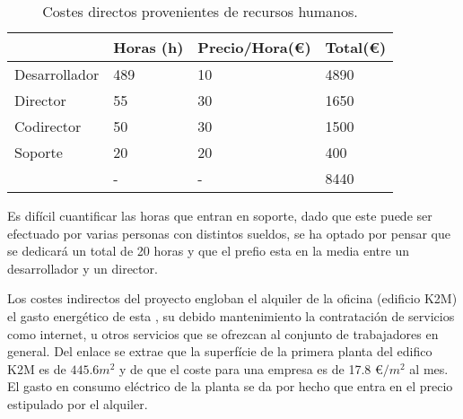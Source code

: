 \begin{table}[H]
\begin{tabular}{l|l|l|l|}
\cline{2-4}
                                                    & Horas (h) & Precio/Hora(\euro) & Total(\euro) \\ \hline
\multicolumn{1}{|l|}{Desarrollador}                 & 489       & 10               & 4890     \\ \hline
\multicolumn{1}{|l|}{Director}                      & 55        & 30               & 1650     \\ \hline
\multicolumn{1}{|l|}{Codirector}                    & 50        & 30               & 1500     \\ \hline
\multicolumn{1}{|l|}{Soporte}                       & 20        & 20               & 400      \\ \hline
\rowcolor{gray!50}
\multicolumn{1}{|l|}{Total} &    -       &  -              &  8440        \\ \hline
\end{tabular}
\caption{Costes directos provenientes de recursos humanos.}
\end{table}

Es difícil cuantificar las horas que entran en soporte, dado que este puede ser efectuado por varias personas con distintos sueldos, se ha optado por pensar que se dedicará un total de 20 horas y que el prefio esta en la media entre un desarrollador y un director.

\par\bigskip

Los costes indirectos del proyecto engloban el alquiler de la oficina (edificio K2M) el gasto energético de esta , su debido mantenimiento la contratación de servicios como internet, u otros servicios que se ofrezcan al conjunto de trabajadores en general. Del enlace \cite{k2msuperficie} se extrae que la superfície de la primera planta del edifico K2M es de $445.6 m^{2}$ y de \cite{k2mpreu} que el coste para una empresa es de 17.8 \euro$/m^{2}$ al mes. El gasto en consumo eléctrico de la planta se da por hecho que entra en el precio estipulado por el alquiler.

